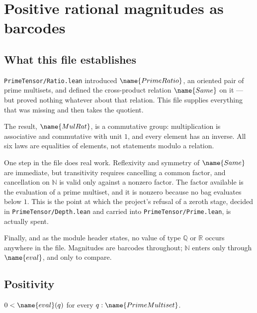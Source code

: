 
\section{Positive rational magnitudes as barcodes}
\label{MulRat:sec}


\subsection*{What this file establishes}

\texttt{PrimeTensor/Ratio.lean} introduced $\name{PrimeRatio}$, an oriented
pair of prime multisets, and defined the cross-product relation
$\name{Same}$ on it --- but proved nothing whatever about that relation.
This file supplies everything that was missing and then takes the quotient.

The result, $\name{MulRat}$, is a commutative group: multiplication is
associative and commutative with unit $1$, and every element has an inverse.
All six laws are equalities of elements, not statements modulo a relation.

One step in the file does real work.  Reflexivity and symmetry of
$\name{Same}$ are immediate, but transitivity requires cancelling a common
factor, and cancellation on $\mathbb{N}$ is valid only against a nonzero
factor.  The factor available is the evaluation of a prime multiset, and it is
nonzero because no bag evaluates below $1$.  This is the point at which the
project's refusal of a zeroth stage, decided in
\texttt{PrimeTensor/Depth.lean} and carried into
\texttt{PrimeTensor/Prime.lean}, is actually spent.

Finally, and as the module header states, no value of type $\mathbb{Q}$ or
$\mathbb{R}$ occurs anywhere in the file.  Magnitudes are barcodes throughout;
$\mathbb{N}$ enters only through $\name{eval}$, and only to compare.

\subsection{Positivity}

\begin{lemma}\label{MulRat:lem:pos}
$0 < \name{eval}(q)$ for every $q : \name{PrimeMultiset}$.
\end{lemma}

